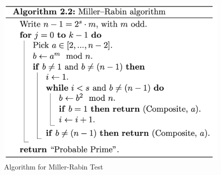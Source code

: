 \begin{figure}[h!]
    \centering
    \includegraphics[scale=0.65]{img/MRprimetest.png}
    \caption{Algorithm for Miller-Rabin Test}
\end{figure}




